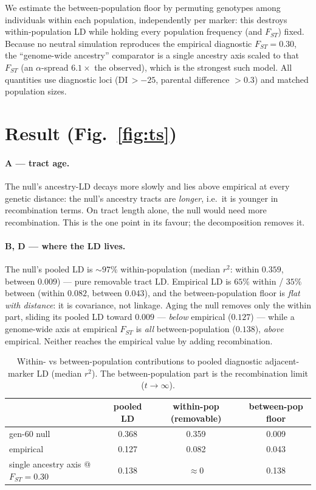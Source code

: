 \documentclass[11pt,a4paper]{article}
\begin{document}
We estimate the between-population floor by permuting genotypes among individuals within
each population, independently per marker: this destroys within-population LD while
holding every population frequency (and $F_{ST}$) fixed. Because no neutral simulation
reproduces the empirical diagnostic $F_{ST}=0.30$, the ``genome-wide ancestry''
comparator is a single ancestry axis scaled to that $F_{ST}$ (an $\alpha$-spread
$6.1\times$ the observed), which is the strongest such model. All quantities use
diagnostic loci (DI\,$>-25$, parental difference $>0.3$) and matched population sizes.

\section{Result (Fig.~\ref{fig:ts})}

\paragraph{A --- tract age.} The null's ancestry-LD decays more slowly and lies above
empirical at every genetic distance: the null's ancestry tracts are \emph{longer}, i.e.\
it is younger in recombination terms. On tract length alone, the null would need more
recombination. This is the one point in its favour; the decomposition removes it.

\paragraph{B, D --- where the LD lives.} The null's pooled LD is $\sim\!97\%$
within-population (median $r^2$: within $0.359$, between $0.009$) --- pure removable
tract LD. Empirical LD is $65\%$ within / $35\%$ between (within $0.082$, between
$0.043$), and the between-population floor is \emph{flat with distance}: it is
covariance, not linkage. Aging the null removes only the within part, sliding its pooled
LD toward $0.009$ --- \emph{below} empirical ($0.127$) --- while a genome-wide axis at
empirical $F_{ST}$ is \emph{all} between-population ($0.138$), \emph{above} empirical.
Neither reaches the empirical value by adding recombination.

\begin{table}[h]\centering
\caption{Within- vs between-population contributions to pooled diagnostic adjacent-marker
LD (median $r^2$). The between-population part is the recombination limit ($t\to\infty$).}
\label{tab:decomp}
\begin{tabular}{lccc}
\toprule
 & pooled LD & within-pop (removable) & between-pop floor \\
\midrule
gen-60 null                       & 0.368 & 0.359 & 0.009 \\
empirical                         & 0.127 & 0.082 & 0.043 \\
single ancestry axis @ $F_{ST}{=}0.30$ & 0.138 & $\approx\!0$ & 0.138 \\
\bottomrule
\end{tabular}
\end{table}
\end{document}
